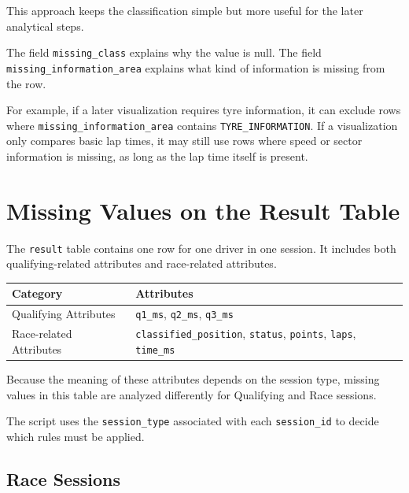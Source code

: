 \documentclass[a4paper,11pt]{article}
\begin{document}
	This approach keeps the classification simple but more useful for the later analytical
	steps.
	
	The field \texttt{missing\_class} explains why the value is null.
	The field \texttt{missing\_information\_area} explains what kind of information is
	missing from the row.
	
	For example, if a later visualization requires tyre information, it can exclude rows where \texttt{missing\_information\_area} contains \texttt{TYRE\_INFORMATION}.
	If a visualization only compares basic lap times, it may still use rows where speed
	or sector information is missing, as long as the lap time itself is present.

	
	
	\section{Missing Values on the Result Table}
	
	The \texttt{result} table contains one row for one driver in one session.
	It includes both qualifying-related attributes and race-related attributes.
	
	\begin{table}[H]
		\centering
		\small
		\begin{tabular}{p{4cm} p{10.5cm}}
			\toprule
			\textbf{Category} & \textbf{Attributes} \\
			\midrule
			Qualifying Attributes &
			\texttt{q1\_ms}, \texttt{q2\_ms}, \texttt{q3\_ms} \\[0.2cm]
			
			Race-related Attributes &
			\texttt{classified\_position}, \texttt{status}, \texttt{points}, \texttt{laps}, \texttt{time\_ms} \\
			\bottomrule
		\end{tabular}
	\end{table}
	
	Because the meaning of these attributes depends on the session type, missing values in this table are analyzed differently for Qualifying and Race sessions.
	
	The script uses the \texttt{session\_type} associated with each \texttt{session\_id}
	to decide which rules must be applied.
	
	\subsection{Race Sessions}
	
\end{document}
